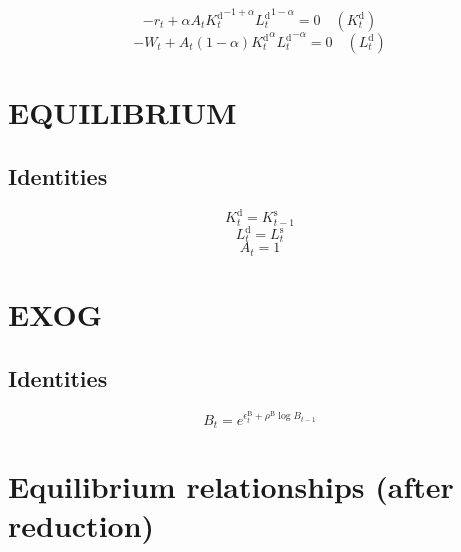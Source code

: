 \begin{equation}
-r_{t} + {\alpha} {A_{t}} {{K^{\mathrm{d}}_{t}}^{-1 + \alpha}} {{L^{\mathrm{d}}_{t}}^{1 - \alpha}} = 0
 \quad \left(K^{\mathrm{d}}_{t}\right)
\end{equation}
\begin{equation}
-W_{t} + {A_{t}} \left(1 - \alpha\right) {{K^{\mathrm{d}}_{t}}^{\alpha}} {{L^{\mathrm{d}}_{t}}^{-\alpha}} = 0
 \quad \left(L^{\mathrm{d}}_{t}\right)
\end{equation}




\section{EQUILIBRIUM}

\subsection{Identities}

\begin{equation}
K^{\mathrm{d}}_{t} = K^{\mathrm{s}}_{t-1}
\end{equation}
\begin{equation}
L^{\mathrm{d}}_{t} = L^{\mathrm{s}}_{t}
\end{equation}
\begin{equation}
A_{t} = 1
\end{equation}




\section{EXOG}

\subsection{Identities}

\begin{equation}
B_{t} = e^{\epsilon^{\mathrm{B}}_{t} + {\rho^{\mathrm{B}}} {\log{B_{t-1}}}}
\end{equation}




\section{Equilibrium relationships (after reduction)}

